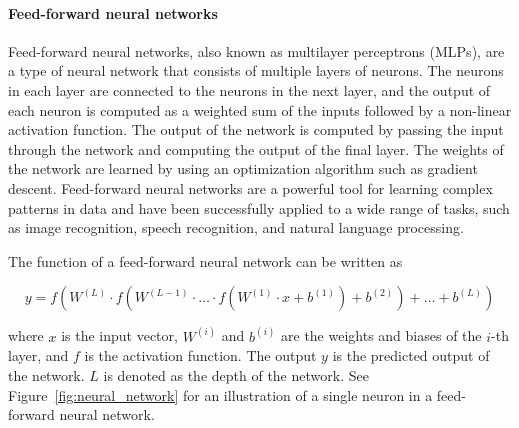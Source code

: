 \paragraph{Feed-forward neural networks}

Feed-forward neural networks, also known as multilayer perceptrons (MLPs), are a type of neural network that consists of multiple layers of neurons. The neurons in each layer are connected to the neurons in the next layer, and the output of each neuron is computed as a weighted sum of the inputs followed by a non-linear activation function. The output of the network is computed by passing the input through the network and computing the output of the final layer. The weights of the network are learned by using an optimization algorithm such as gradient descent. Feed-forward neural networks are a powerful tool for learning complex patterns in data and have been successfully applied to a wide range of tasks, such as image recognition, speech recognition, and natural language processing.

The function of a feed-forward neural network can be written as

$$ 
    y = f(W^{(L)} \cdot f(W^{(L-1)} \cdot \ldots \cdot f(W^{(1)} \cdot x + b^{(1)}) + b^{(2)}) + \ldots + b^{(L)})
$$

where $x$ is the input vector, $W^{(i)}$ and $b^{(i)}$ are the weights and biases of the $i$-th layer, and $f$ is the activation function. The output $y$ is the predicted output of the network. $L$ is denoted as the depth of the network. See Figure~\ref{fig:neural_network} for an illustration of a single neuron in a feed-forward neural network.

